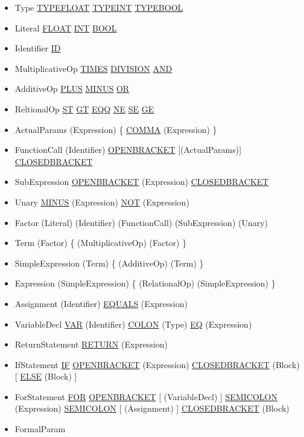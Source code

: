 \begin{itemize}
	\item Type
		\subitem \ul{TYPE\un FLOAT}
		\subitem \ul{TYPE\un INT}
		\subitem \ul{TYPE\un BOOL}
	\item Literal
		\subitem \ul{FLOAT}
		\subitem \ul{INT}
		\subitem \ul{BOOL}
	\item Identifier
		\subitem \ul{ID}
	\item MultiplicativeOp
		\subitem \ul{TIMES}
		\subitem \ul{DIVISION}
		\subitem \ul{AND}
	\item AdditiveOp
		\subitem \ul{PLUS}
		\subitem \ul{MINUS}
		\subitem \ul{OR}
	\item ReltionalOp
		\subitem \ul{ST}
		\subitem \ul{GT}
		\subitem \ul{EQQ}
		\subitem \ul{NE}
		\subitem \ul{SE}
		\subitem \ul{GE}
	\item ActualParams
		\subitem (Expression) \{ \ul{COMMA} (Expression) \}
	\item FunctionCall
		\subitem (Identifier) \ul{OPEN\un BRACKET} [(ActualParams)] \ul{CLOSED\un BRACKET}
	\item SubExpression 
		\subitem \ul{OPEN\un BRACKET} (Expression) \ul{CLOSED\un BRACKET}
	\item Unary
		\subitem \ul{MINUS} (Expression)
		\subitem \ul{NOT} (Expression)
	\item Factor
		\subitem (Literal)
		\subitem (Identifier)
		\subitem (FunctionCall)
		\subitem (SubExpression)
		\subitem (Unary)
	\item Term
		\subitem (Factor) \{ (MultiplicativeOp) (Factor) \}
	\item SimpleExpression
		\subitem (Term) \{ (AdditiveOp) (Term) \}
	\item Expression
		\subitem (SimpleExpression) \{ (RelationalOp) (SimpleExpression) \}
	\item Assignment
		\subitem (Identifier) \ul{EQUALS} (Expression)
	\item VariableDecl
		\subitem \ul{VAR} (Identifier) \ul{COLON} (Type)	\ul{EQ} (Expression)
	\item ReturnStatement
		\subitem \ul{RETURN} (Expression)
	\item IfStatement
		\subitem \ul{IF} \ul{OPEN\un BRACKET} (Expression) \ul{CLOSED\un BRACKET} (Block) [ \ul{ELSE} (Block) ]
	\item ForStatement
		\subitem \ul{FOR} \ul{OPEN\un BRACKET} [ (VariableDecl) ] \ul{SEMI\un COLON} (Expression) \ul{SEMI\un COLON} [ (Assignment) ] \ul{CLOSED\un BRACKET} (Block)
	\item FormalParam

\end{itemize}

